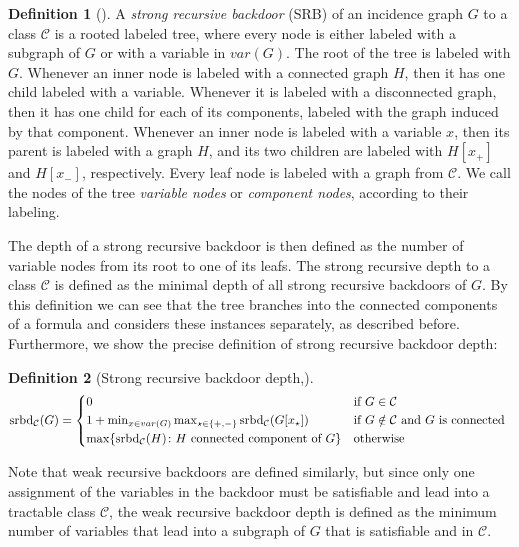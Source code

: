 \documentclass[11pt,a4paper]{article}
\theoremstyle{definition}
\newtheorem{definition}{Definition}[section]
\theoremstyle{proposition}
\begin{document}
\begin{definition}[{\cite[p.4]{maehlmann2021recursive}}]
A \textit{strong recursive backdoor} (SRB) of an incidence graph $G$ to a class $\mathcal{C}$ is a rooted labeled tree, where every node is either labeled with a subgraph of $G$ or with a variable in $var(G)$. The root of the tree is labeled with $G$. Whenever an inner node is labeled with a connected graph $H$, then it has one child labeled with a variable. Whenever it is labeled with a disconnected graph, then it has one child for each of its components, labeled with the graph induced by that component. Whenever an inner node is labeled with a variable $x$, then its parent is labeled with a graph $H$, and its two children are labeled with $H[x_+]$ and $H[x_-]$, respectively. Every leaf node is labeled with a graph from $\mathcal{C}$. We call the nodes of the tree \textit{variable nodes} or \textit{component nodes}, according to their labeling. 
\end{definition}
The depth of a strong recursive backdoor is then defined as the number of variable nodes from its root to one of its leafs. The strong recursive depth to a class $\mathcal{C}$ is defined as the minimal depth of all strong recursive backdoors of $G$. By this definition we can see that the tree branches into the connected components of a formula and considers these instances separately, as described before. Furthermore, we show the precise definition of strong recursive backdoor depth:
\begin{definition}[Strong recursive backdoor depth,{\cite[Definition 3.1, p.5]{maehlmann2021recursive}}]

\begin{equation*}
    \text{srbd}_{\mathcal{C}}(G) = 
    \begin{cases*}
      0 & if $G \in \mathcal{C}$  \\
	1 + \min_{x \in var(G)} \max_{\star \in \{+,-\}} \text{srbd}_{\mathcal{C}}(G[x_{\star}]) & if $G \notin \mathcal{C}$ and $G$ is connected \\
      \max \{  \text{srbd}_{\mathcal{C}}(H) \colon H \text{ connected component of } G \}       & otherwise 
    \end{cases*}
  \end{equation*}
\end{definition}
Note that weak recursive backdoors are defined similarly, but since only one assignment of the variables in the backdoor must be satisfiable and lead into a tractable class $\mathcal{C}$, the weak recursive backdoor depth is defined as the minimum number of variables that lead into a subgraph of $G$ that is satisfiable and in $\mathcal{C}$.
\end{document}
